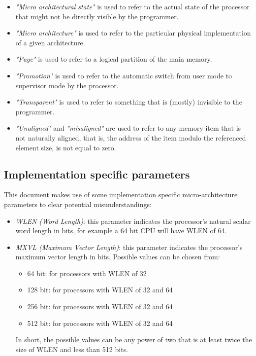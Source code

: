 \documentclass{article}
\begin{document}
\begin{itemize}
            \item \textit{"Micro architectural state"} is used to refer to the actual state of the processor that might not be directly visible by the programmer.
            \item \textit{"Micro architecture"} is used to refer to the particular physical implementation of a given architecture.
            \item \textit{"Page"} is used to refer to a logical partition of the main memory.
            \item \textit{"Promotion"} is used to refer to the automatic switch from user mode to supervisor mode by the processor.
            \item \textit{"Transparent"} is used to refer to something that is (mostly) invisible to the programmer.
            \item \textit{"Unaligned"} and \textit{"misaligned"} are used to refer to any memory item that is not naturally aligned, that is, the address of the item modulo the referenced element size, is not equal to zero.

        \end{itemize}

    \subsection[Implementation specific parameters]{Implementation specific parameters}

        This document makes use of some implementation specific micro-architecture parameters to clear potential misunderstandings:

        \begin{itemize}

            \item \textit{WLEN (Word Length)}: this parameter indicates the processor's natural scalar word length in bits, for example a 64 bit CPU will have WLEN of 64.
            \item \textit{MXVL (Maximum Vector Length)}: this parameter indicates the processor's maximum vector length in bits. Possible values can be chosen from:

                \begin{itemize}

                    \item 64 bit: for processors with WLEN of 32
                    \item 128 bit: for processors with WLEN of 32 and 64
                    \item 256 bit: for processors with WLEN of 32 and 64
                    \item 512 bit: for processors with WLEN of 32 and 64

                \end{itemize}

                In short, the possible values can be any power of two that is at least twice the size of WLEN and less than 512 bits.

        \end{itemize}
\end{document}
